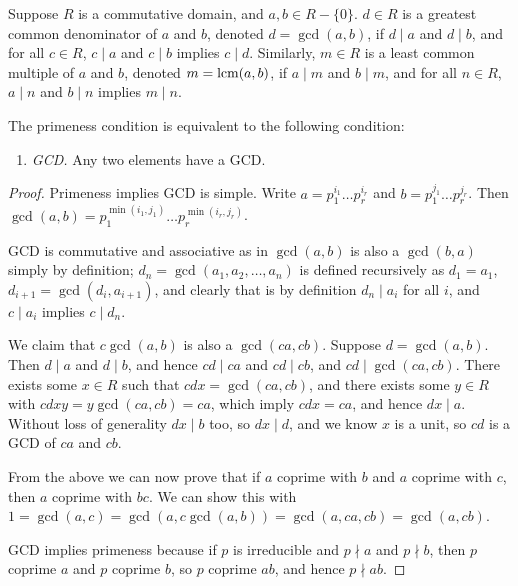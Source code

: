 \begin{definition}
    Suppose \(R\) is a commutative domain, and \(a,b \in R - \{0\}\).
    \(d \in R\) is a greatest common denominator of \(a\) and \(b\),
    denoted \(d = \gcd(a,b)\),
    if \(d \mid a\) and \(d \mid b\),
    and for all \(c \in R\), \(c \mid a\) and \(c \mid b\) implies \(c \mid d\).
    Similarly, \(m \in R\) is a least common multiple of \(a\) and \(b\),
    denoted \(m = \operatorname{lcm}(a,b)\),
    if \(a \mid m\) and \(b \mid m\),
    and for all \(n \in R\), \(a \mid n\) and \(b \mid n\) implies \(m \mid n\).
\end{definition}
\begin{theorem}
    The primeness condition is equivalent to the following condition:
    \begin{enumerate}[itemsep=0mm]
        \item[(ii)] \textit{GCD.}
        Any two elements have a GCD.\@
    \end{enumerate}
\end{theorem}
\begin{proof}
    Primeness implies GCD is simple.
    Write \(a = p_1^{i_1} \hdots p_r^{i_r}\)
    and \(b = p_1^{j_1} \hdots p_r^{j_r}\).
    Then \(\gcd(a,b) = p_1^{\min(i_1,j_1)} \hdots p_r^{\min(i_r,j_r)}\).

    \medskip

    GCD is commutative and associative
    as in \(\gcd(a,b)\) is also a \(\gcd(b,a)\) simply by definition;
    \(d_n = \gcd(a_1,a_2,\hdots,a_n)\) is defined recursively as
    \(d_1 = a_1\), \(d_{i+1} = \gcd(d_i,a_{i+1})\),
    and clearly that is by definition \(d_n \mid a_i\) for all \(i\),
    and \(c \mid a_i\) implies \(c \mid d_n\).

    We claim that \(c\gcd(a,b)\) is also a \(\gcd(ca,cb)\).
    Suppose \(d = \gcd(a,b)\).
    Then \(d \mid a\) and \(d \mid b\),
    and hence \(cd \mid ca\) and \(cd \mid cb\),
    and \(cd \mid \gcd(ca,cb)\).
    There exists some \(x \in R\) such that \(cdx = \gcd(ca,cb)\),
    and there exists some \(y \in R\) with \(cdxy = y\gcd(ca,cb) = ca\),
    which imply \(cdx = ca\), and hence \(dx \mid a\).
    Without loss of generality \(dx \mid b\) too, so \(dx \mid d\),
    and we know \(x\) is a unit, so \(cd\) is a GCD of \(ca\) and \(cb\).

    From the above we can now prove that if \(a\) coprime with \(b\)
    and \(a\) coprime with \(c\),
    then \(a\) coprime with \(bc\).
    We can show this with \(1 = \gcd(a,c) = \gcd(a,c\gcd(a,b))
    = \gcd(a,ca,cb) = \gcd(a,cb)\).

    GCD implies primeness because if \(p\) is irreducible
    and \(p \nmid a\) and \(p \nmid b\),
    then \(p\) coprime \(a\) and \(p\) coprime \(b\),
    so \(p\) coprime \(ab\),
    and hence \(p \nmid ab\).
\end{proof}


